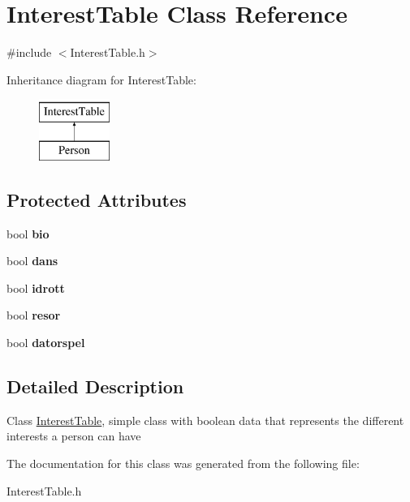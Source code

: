 \hypertarget{class_interest_table}{\section{Interest\-Table Class Reference}
\label{class_interest_table}
}


{\ttfamily \#include $<$Interest\-Table.\-h$>$}

Inheritance diagram for Interest\-Table\-:\begin{figure}[H]
\begin{center}
\leavevmode
\includegraphics[height=2.000000cm]{class_interest_table}
\end{center}
\end{figure}
\subsection*{Protected Attributes}
\begin{DoxyCompactItemize}
\item 
\hypertarget{class_interest_table_a97403f73599c21d0acee16d7863562e5}{bool {\bfseries bio}}\label{class_interest_table_a97403f73599c21d0acee16d7863562e5}

\item 
\hypertarget{class_interest_table_a8f89aba60fb92d651f8c98d8a7fd5e99}{bool {\bfseries dans}}\label{class_interest_table_a8f89aba60fb92d651f8c98d8a7fd5e99}

\item 
\hypertarget{class_interest_table_a3b8f1b72fe7d37696d9c0867be14d40c}{bool {\bfseries idrott}}\label{class_interest_table_a3b8f1b72fe7d37696d9c0867be14d40c}

\item 
\hypertarget{class_interest_table_a16045ea05466c8c1bb2a5fd2e9d76c13}{bool {\bfseries resor}}\label{class_interest_table_a16045ea05466c8c1bb2a5fd2e9d76c13}

\item 
\hypertarget{class_interest_table_a6fba49d939fb0ead46879905508f20ae}{bool {\bfseries datorspel}}\label{class_interest_table_a6fba49d939fb0ead46879905508f20ae}

\end{DoxyCompactItemize}


\subsection{Detailed Description}
Class \hyperlink{class_interest_table}{Interest\-Table}, simple class with boolean data that represents the different interests a person can have 

The documentation for this class was generated from the following file\-:\begin{DoxyCompactItemize}
\item 
Interest\-Table.\-h\end{DoxyCompactItemize}
